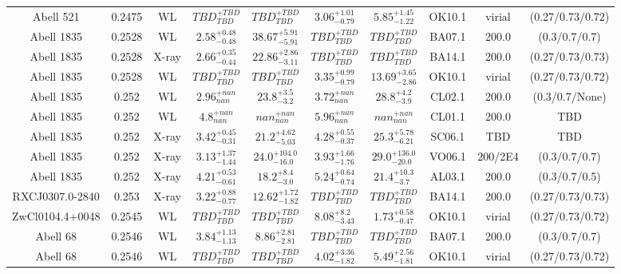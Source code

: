 \begin{table}
\begin{tabular}{cccccccccc}
Abell 521 & 0.2475 & WL & ${TBD}^{+TBD}_{TBD}$ & ${TBD}^{+TBD}_{TBD}$ & ${3.06}^{+1.01}_{-0.79}$ & ${5.85}^{+1.45}_{-1.22}$ & OK10.1 & virial & (0.27/0.73/0.72) \\
Abell 1835 & 0.2528 & WL & ${2.58}^{+0.48}_{-0.48}$ & ${38.67}^{+5.91}_{-5.91}$ & ${TBD}^{+TBD}_{TBD}$ & ${TBD}^{+TBD}_{TBD}$ & BA07.1 & 200.0 & (0.3/0.7/0.7) \\
Abell 1835 & 0.2528 & X-ray & ${2.66}^{+0.35}_{-0.44}$ & ${22.86}^{+2.86}_{-3.11}$ & ${TBD}^{+TBD}_{TBD}$ & ${TBD}^{+TBD}_{TBD}$ & BA14.1 & 200.0 & (0.27/0.73/0.73) \\
Abell 1835 & 0.2528 & WL & ${TBD}^{+TBD}_{TBD}$ & ${TBD}^{+TBD}_{TBD}$ & ${3.35}^{+0.99}_{-0.79}$ & ${13.69}^{+3.65}_{-2.86}$ & OK10.1 & virial & (0.27/0.73/0.72) \\
Abell 1835 & 0.252 & WL & ${2.96}^{+nan}_{nan}$ & ${23.8}^{+3.5}_{-3.2}$ & ${3.72}^{+nan}_{nan}$ & ${28.8}^{+4.2}_{-3.9}$ & CL02.1 & 200.0 & (0.3/0.7/None) \\
Abell 1835 & 0.252 & WL & ${4.8}^{+nan}_{nan}$ & ${nan}^{+nan}_{nan}$ & ${5.96}^{+nan}_{nan}$ & ${nan}^{+nan}_{nan}$ & CL01.1 & 200.0 & TBD \\
Abell 1835 & 0.252 & X-ray & ${3.42}^{+0.45}_{-0.31}$ & ${21.2}^{+4.62}_{-5.03}$ & ${4.28}^{+0.55}_{-0.37}$ & ${25.3}^{+5.78}_{-6.21}$ & SC06.1 & TBD & TBD \\
Abell 1835 & 0.252 & X-ray & ${3.13}^{+1.37}_{-1.44}$ & ${24.0}^{+104.0}_{-16.0}$ & ${3.93}^{+1.66}_{-1.76}$ & ${29.0}^{+136.0}_{-20.0}$ & VO06.1 & 200/2E4 & (0.3/0.7/0.7) \\
Abell 1835 & 0.252 & X-ray & ${4.21}^{+0.53}_{-0.61}$ & ${18.2}^{+8.4}_{-3.0}$ & ${5.24}^{+0.64}_{-0.74}$ & ${21.4}^{+10.3}_{-3.7}$ & AL03.1 & 200.0 & (0.3/0.7/0.5) \\
RXCJ0307.0-2840 & 0.253 & X-ray & ${3.22}^{+0.88}_{-0.77}$ & ${12.62}^{+1.72}_{-1.82}$ & ${TBD}^{+TBD}_{TBD}$ & ${TBD}^{+TBD}_{TBD}$ & BA14.1 & 200.0 & (0.27/0.73/0.73) \\
ZwCl0104.4+0048 & 0.2545 & WL & ${TBD}^{+TBD}_{TBD}$ & ${TBD}^{+TBD}_{TBD}$ & ${8.08}^{+8.2}_{-3.43}$ & ${1.73}^{+0.58}_{-0.47}$ & OK10.1 & virial & (0.27/0.73/0.72) \\
Abell 68 & 0.2546 & WL & ${3.84}^{+1.13}_{-1.13}$ & ${8.86}^{+2.81}_{-2.81}$ & ${TBD}^{+TBD}_{TBD}$ & ${TBD}^{+TBD}_{TBD}$ & BA07.1 & 200.0 & (0.3/0.7/0.7) \\
Abell 68 & 0.2546 & WL & ${TBD}^{+TBD}_{TBD}$ & ${TBD}^{+TBD}_{TBD}$ & ${4.02}^{+3.36}_{-1.82}$ & ${5.49}^{+2.56}_{-1.81}$ & OK10.1 & virial & (0.27/0.73/0.72) \\

\end{tabular}
\end{table}
